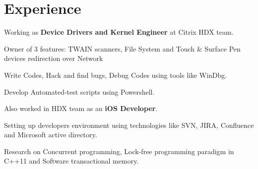 \documentclass[letterpaper]{kishore-resume} %
\begin{document}
\begin{minipage}[t]{0.66\textwidth} %


\section{Experience}

\sectionspace %
\begin{tightitemize}
\item Working as \textbf{Device Drivers and Kernel Engineer} at Citrix HDX team.
\item Owner of 3 features: TWAIN scanners, File System and Touch \& Surface Pen devices redirection over Network
\item Write Codes, Hack and find bugs, Debug Codes using tools like WinDbg. 
\item Develop Automated-test scripts using Powershell.
\item Also worked in HDX team as an \textbf{iOS Developer}.  
\end{tightitemize}

\begin{tightitemize}
\item Setting up developers environment using technologies like SVN, JIRA, Confluence and 
Microsoft active directory.  
\end{tightitemize}


\begin{tightitemize}
\item Research on Concurrent programming, Lock-free programming paradigm in C++11 and Software transactional memory.
\end{tightitemize}



\end{minipage}
\end{document}
